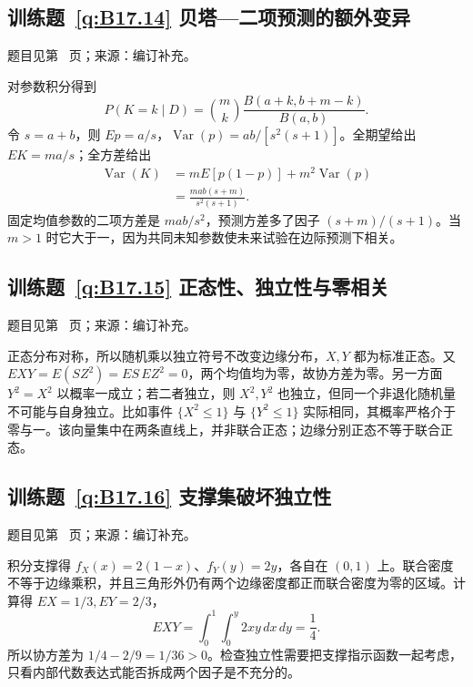 \documentclass[UTF8,12pt,a4paper,fontset=fandol]{ctexbook}
\begin{document}
\subsection*{训练题~\ref{q:B17.14} 贝塔—二项预测的额外变异}\label{a:B17.14}{\small 题目见第~\pageref{q:B17.14} 页；来源：编订补充。}
\begin{solve}对参数积分得到\[P(K=k\mid D)=\binom mk\frac{B(a+k,b+m-k)}{B(a,b)}.\]令 $s=a+b$，则 $Ep=a/s$，$\operatorname{Var}(p)=ab/[s^2(s+1)]$。全期望给出 $EK=ma/s$；全方差给出\[\begin{aligned}\operatorname{Var}(K)&=mE[p(1-p)]+m^2\operatorname{Var}(p)\\&=\frac{mab(s+m)}{s^2(s+1)}.\end{aligned}\]固定均值参数的二项方差是 $mab/s^2$，预测方差多了因子 $(s+m)/(s+1)$。当 $m>1$ 时它大于一，因为共同未知参数使未来试验在边际预测下相关。\end{solve}

\subsection*{训练题~\ref{q:B17.15} 正态性、独立性与零相关}\label{a:B17.15}{\small 题目见第~\pageref{q:B17.15} 页；来源：编订补充。}
\begin{solve}正态分布对称，所以随机乘以独立符号不改变边缘分布，$X,Y$ 都为标准正态。又 $EXY=E(SZ^2)=ES\,EZ^2=0$，两个均值均为零，故协方差为零。另一方面 $Y^2=X^2$ 以概率一成立；若二者独立，则 $X^2,Y^2$ 也独立，但同一个非退化随机量不可能与自身独立。比如事件 $\{X^2\le1\}$ 与 $\{Y^2\le1\}$ 实际相同，其概率严格介于零与一。该向量集中在两条直线上，并非联合正态；边缘分别正态不等于联合正态。\end{solve}

\subsection*{训练题~\ref{q:B17.16} 支撑集破坏独立性}\label{a:B17.16}{\small 题目见第~\pageref{q:B17.16} 页；来源：编订补充。}
\begin{solve}积分支撑得 $f_X(x)=2(1-x)$、$f_Y(y)=2y$，各自在 $(0,1)$ 上。联合密度不等于边缘乘积，并且三角形外仍有两个边缘密度都正而联合密度为零的区域。计算得 $EX=1/3,EY=2/3$，\[EXY=\int_0^1\int_0^y2xy\,dx\,dy=\frac14.\]所以协方差为 $1/4-2/9=1/36>0$。检查独立性需要把支撑指示函数一起考虑，只看内部代数表达式能否拆成两个因子是不充分的。\end{solve}
\end{document}
